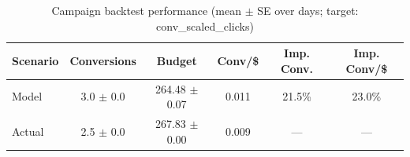 \begin{table}[htbp]
\centering
\caption{Campaign backtest performance (mean $\pm$ SE over days; target: conv_scaled_clicks)}
\begin{tabular}{lccccc}
\toprule
Scenario & Conversions & Budget & Conv/\$ & Imp. Conv. & Imp. Conv/\$ \\
\midrule
Model & 3.0 $\pm$ 0.0 & 264.48 $\pm$ 0.07 & 0.011 & 21.5\% & 23.0\% \\
Actual & 2.5 $\pm$ 0.0 & 267.83 $\pm$ 0.00 & 0.009 & --- & --- \\
\bottomrule
\end{tabular}

\end{table}
